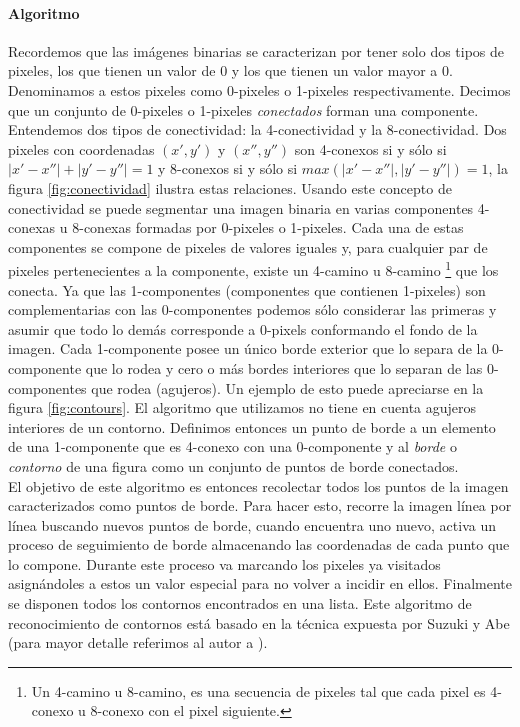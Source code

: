 	\paragraph{Algoritmo} 
	Recordemos que las im\'agenes binarias se caracterizan por tener solo 
	dos tipos de pixeles, los que tienen un valor de $0$ y los que tienen 
	un valor mayor a 0. Denominamos a estos pixeles como 
	0-pixeles o 1-pixeles respectivamente. Decimos que un conjunto de 
	0-pixeles o 1-pixeles \textit{conectados} forman una componente. Entendemos dos tipos de conectividad:
	la 4-conectividad y la 8-conectividad. Dos pixeles con coordenadas 
	$(x',y')$ y $(x'',y'')$ son 4-conexos si y s\'olo si 
	$|x' - x''| + |y'-y''| = 1$ y 8-conexos si y s\'olo si $max(|x'-x''|,|y'-y''|)=1$, la figura \ref{fig:conectividad} ilustra estas relaciones.
	Usando este concepto de conectividad se puede segmentar una imagen 
	binaria en varias componentes 4-conexas u 8-conexas formadas por 
	 0-pixeles o 1-pixeles. Cada una de estas
	componentes se compone de pixeles de valores iguales y, para cualquier 
	par de pixeles pertenecientes a la componente, existe un 
	4-camino u 8-camino \footnote{ Un 4-camino u 8-camino, es una secuencia 
	de pixeles tal que cada pixel es 4-conexo u 8-conexo con el pixel 
	siguiente.} que los
	conecta. Ya que las 1-componentes (componentes que contienen 
	1-pixeles) son complementarias con las 0-componentes podemos s\'olo considerar las primeras y asumir que todo
	lo dem\'as corresponde a 0-pixels conformando el fondo de la imagen. Cada 
	1-componente posee un \'unico borde exterior que lo separa de la 0-componente que lo rodea y cero o m\'as bordes interiores que lo separan de las 0-componentes que rodea (agujeros). Un ejemplo de esto puede apreciarse
	en la figura \ref{fig:contours}. El algoritmo que utilizamos no tiene 
	en cuenta agujeros interiores de un contorno. Definimos entonces un 
	punto de borde a un elemento de una 1-componente que es 4-conexo con 
	una 0-componente y al \textit{borde} o \textit{contorno} de una figura 
	como un conjunto de puntos de borde conectados.\\
	\indent El objetivo de este algoritmo es entonces recolectar todos los 
	puntos de la imagen caracterizados como puntos de borde. Para 
	hacer esto, recorre la imagen l\'inea por l\'inea buscando nuevos puntos de borde, cuando encuentra
	uno nuevo, activa un proceso de seguimiento de borde almacenando las 
	coordenadas de cada punto que lo compone. Durante este proceso va 
	marcando los pixeles ya 
	visitados asign\'andoles a estos un valor especial para no volver a 
	incidir en ellos. Finalmente se disponen todos los contornos encontrados en una lista.
	Este algoritmo de reconocimiento de contornos est\'a basado en la 
	t\'ecnica expuesta por Suzuki y Abe (para mayor detalle referimos al 
	autor a \cite{suzuki85}).
	
